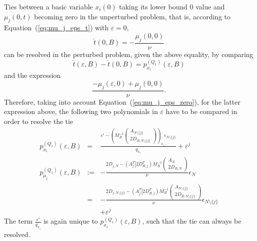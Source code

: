 \documentclass[a4paper]{article}
\newcommand{\pmu}[2]{\ensuremath{p_{\mu_{j}}^{(#1)}(\varepsilon, #2)}}
\newcommand{\px}[3]{\ensuremath{p_{x_{#1}}^{(#2)}(\varepsilon, #3)}}
\begin{document}
Ties between a basic variable $x_{i}(0)$ taking its lower bound $0$ value and
$\mu_{j}\left(0, t\right)$ 
becoming zero in the unperturbed problem, that is,
according to Equation~(\ref{eq:mu_j_eps_t}) with $\varepsilon=0$,
\begin{equation*}
\check{t}\left(0, B\right)  =
-\frac{\mu_{j}\left(0, 0\right)}{\nu}
\end{equation*}
can be resolved in the perturbed problem,
given the above equality, by comparing
\begin{equation*}
\check{t}(\varepsilon, B)-\check{t}(0, B) = \px{i}{Q_{1}}{B}
\end{equation*}
and the expression
\begin{equation*}
\frac{-\mu_{j}(\varepsilon, 0)+ \mu_{j}(0,0)}{\nu}.
\end{equation*}
Therefore, taking into account Equation~(\ref{eq:mu_j_eps_zero}),
for the latter expression above, the following two
polynomials in $\varepsilon$ have to be compared in order to resolve the tie
\begin{eqnarray}
\px{i}{Q_{1}}{B} & = & 
    \frac{\varepsilon^{i} -
         \left(M_{B}^{-1}
           \left(\begin{array}{c}
                    A_{N \setminus \{j\}}  \\
	            \hline
	            2D_{B, N \setminus \{j\}}
	         \end{array}
	   \right)
         \right)_{x_{i}}\epsilon_{N \setminus \{j\}}}{q_{x_{i}}}
	 + \varepsilon^{j} \\
\label{def:p_mu_j_Q_1}
\pmu{Q_{1}}{B} & := &
  -\frac{2D_{j, N} -
    \left(A_{j}^{T} \left| \right. 2D_{B, j}^{T} \right)
    M_{B}^{-1}
    \left(\begin{array}{c}
            A_{N} \\
	    \hline
	    2D_{B,N}
	  \end{array}
    \right)}{\nu}
  \epsilon_{N}
\nonumber \\
&=&
  -\frac{2D_{j, N \setminus \{j\}} -
    \left(A_{j}^{T} \left| \right. 2D_{B, j}^{T} \right)
    M_{B}^{-1}
    \left(\begin{array}{c}
            A_{N \setminus \{j\}} \\
	    \hline
	    2D_{B,N \setminus \{j\}}
	  \end{array}
    \right)}{\nu}
  \epsilon_{N \setminus \{j\}}
\nonumber \\
&&
+\varepsilon^{j}      
\end{eqnarray}
The term $\frac{\varepsilon^{i}}{q_{x_{i}}}$ is again unique to 
\px{i}{Q_{1}}{B}, such that the tie can always
be resolved.
\end{document}
